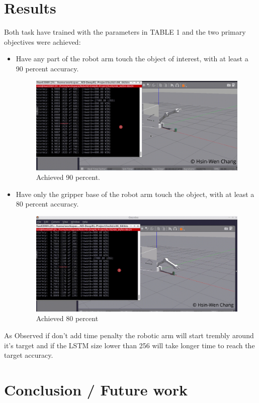 \documentclass[10pt,journal,compsoc]{IEEEtran}
\begin{document}
\section{Results}
Both task have trained with the parameters in TABLE 1 and the two primary objectives were achieved:
\begin{itemize}
\item Have any part of the robot arm touch the object of interest, with at least a 90 percent accuracy. 
\begin{figure}[htpb]
      \centering
      \includegraphics[width=\linewidth]{90.png}
      \caption{Achieved 90 percent.}
      \label{fig:achieved 90 percent}
\end{figure}
\item Have only the gripper base of the robot arm touch the object, with at least a 80 percent accuracy.
\begin{figure}[htpb]
      \centering
      \includegraphics[width=\linewidth]{80.png}
      \caption{Achieved 80 percent}
      \label{fig:achieved 80 percent}
\end{figure}
\end {itemize}
As Observed if don't add time penalty the robotic arm will start trembly around it's target and if the LSTM size lower than 256 will take longer time to reach the target accuracy.

\section{Conclusion / Future work}
\end{document}
